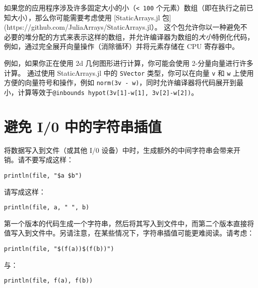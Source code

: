如果您的应用程序涉及许多固定大小的小（\texttt{< 100} 个元素）数组（即在执行之前已知大小），那么你可能需要考虑使用 [StaticArrays.jl 包](https://github.com/JuliaArrays/StaticArrays.jl）。 这个包允许你以一种避免不必要的堆分配的方式来表示这样的数组，并允许编译器为数组的\emph{大小}特例化代码，例如，通过完全展开向量操作（消除循环）并将元素存储在 CPU 寄存器中。



例如，如果你正在使用 2d 几何图形进行计算，你可能会使用 2-分量向量进行许多计算。 通过使用 StaticArrays.jl 中的 \texttt{SVector} 类型，你可以在向量 \texttt{v} 和 \texttt{w} 上使用方便的向量符号和操作，例如 \texttt{norm(3v - w)}，同时允许编译器将代码展开到最小，计算等效于\texttt{@inbounds hypot(3v[1]-w[1], 3v[2]-w[2])}。



\hypertarget{5580481875828136728}{}


\section{避免 I/0 中的字符串插值}



将数据写入到文件（或其他 I/0 设备）中时，生成额外的中间字符串会带来开销。请不要写成这样：




\begin{verbatim}
println(file, "$a $b")
\end{verbatim}



请写成这样：




\begin{verbatim}
println(file, a, " ", b)
\end{verbatim}



第一个版本的代码生成一个字符串，然后将其写入到文件中，而第二个版本直接将值写入到文件中。另请注意，在某些情况下，字符串插值可能更难阅读。请考虑：




\begin{verbatim}
println(file, "$(f(a))$(f(b))")
\end{verbatim}



与：




\begin{verbatim}
println(file, f(a), f(b))
\end{verbatim}




